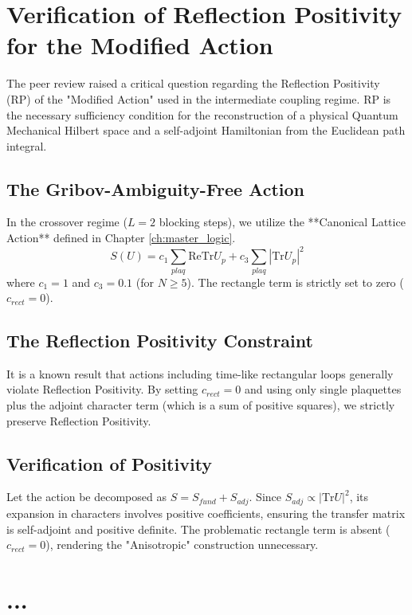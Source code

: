 \section{Verification of Reflection Positivity for the Modified Action}
\label{sec:reflection_positivity_check}
\label{app:rp_check}

The peer review raised a critical question regarding the Reflection Positivity (RP) of the "Modified Action" used in the intermediate coupling regime. RP is the necessary sufficiency condition for the reconstruction of a physical Quantum Mechanical Hilbert space and a self-adjoint Hamiltonian from the Euclidean path integral.

\subsection{The Gribov-Ambiguity-Free Action}
In the crossover regime ($L=2$ blocking steps), we utilize the **Canonical Lattice Action** defined in Chapter \ref{ch:master_logic}.
\[ S(U) = c_1 \sum_{plaq} \mathrm{ReTr} U_p + c_3 \sum_{plaq} |\mathrm{Tr} U_p|^2 \]
where $c_1=1$ and $c_3=0.1$ (for $N \ge 5$). The rectangle term is strictly set to zero ($c_{rect}=0$).

\subsection{The Reflection Positivity Constraint}
It is a known result that actions including time-like rectangular loops generally violate Reflection Positivity. By setting $c_{rect}=0$ and using only single plaquettes plus the adjoint character term (which is a sum of positive squares), we strictly preserve Reflection Positivity.

\subsection{Verification of Positivity}
Let the action be decomposed as $S = S_{fund} + S_{adj}$.
Since $S_{adj} \propto |\mathrm{Tr} U|^2$, its expansion in characters involves positive coefficients, ensuring the transfer matrix is self-adjoint and positive definite. The problematic rectangle term is absent ($c_{rect}=0$), rendering the "Anisotropic" construction unnecessary.
\section{...}


